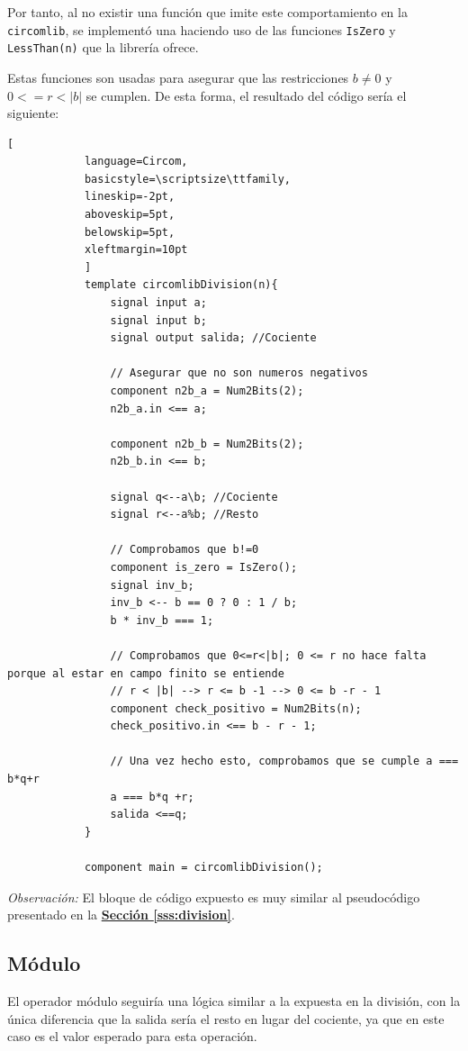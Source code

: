 \documentclass[a4paper,12pt]{report}
\begin{document}
	\vspace{0.2cm}
	\noindent Por tanto, al no existir una función que imite este comportamiento en la \texttt{circomlib}, se implementó una haciendo uso de las funciones \texttt{IsZero} y \texttt{LessThan(n)} que la librería ofrece.
	
	\vspace{0.2cm}
	\noindent Estas funciones son usadas para asegurar que las restricciones $b\neq0$ y $0<=r<|b|$ se cumplen. De esta forma, el resultado del código sería el siguiente:
	
	\begin{mi_ejemplo}
		\caption{Creación de división usando funciones de circomlib}
		\label{ex:div-circomlib}
		\begin{lstlisting}[
			language=Circom,
			basicstyle=\scriptsize\ttfamily, 
			lineskip=-2pt,                  
			aboveskip=5pt,                  
			belowskip=5pt,                  
			xleftmargin=10pt
			]
			template circomlibDivision(n){
				signal input a;
				signal input b;
				signal output salida; //Cociente
				
				// Asegurar que no son numeros negativos
				component n2b_a = Num2Bits(2);
				n2b_a.in <== a;
				
				component n2b_b = Num2Bits(2);
				n2b_b.in <== b;
				
				signal q<--a\b; //Cociente
				signal r<--a%b; //Resto
				
				// Comprobamos que b!=0
				component is_zero = IsZero();
				signal inv_b;
				inv_b <-- b == 0 ? 0 : 1 / b;
				b * inv_b === 1; 
				
				// Comprobamos que 0<=r<|b|; 0 <= r no hace falta porque al estar en campo finito se entiende
				// r < |b| --> r <= b -1 --> 0 <= b -r - 1
				component check_positivo = Num2Bits(n);
				check_positivo.in <== b - r - 1;
				
				// Una vez hecho esto, comprobamos que se cumple a === b*q+r
				a === b*q +r;
				salida <==q; 
			}
			
			component main = circomlibDivision();
		\end{lstlisting}
	\end{mi_ejemplo}
	
	\noindent \textit{Observación: } El bloque de código expuesto es muy similar al pseudocódigo presentado en la \hyperref[sss:division]{\textbf{Sección \ref{sss:division}}}.
	
	\subsection{Módulo}
	\label{sec:ver-modulo}
	\noindent El operador módulo seguiría una lógica similar a la expuesta en la división, con la única diferencia que la salida sería el resto en lugar del cociente, ya que en este caso es el valor esperado para esta operación.
	
\end{document}
